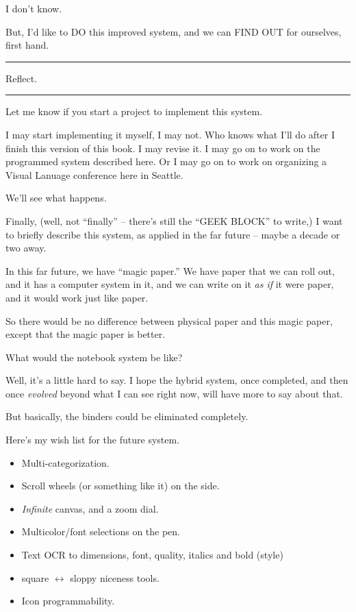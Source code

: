 \documentclass[oneside,fontsize=10,a5paper]{scrbook}
\newcommand\pause{\bigskip\noindent}
\begin{document}
I don't know.

But, I'd like to DO this improved system, and we can FIND OUT for
ourselves, first hand.

\pause
\hrule

Reflect.

\hrule
\pause

Let me know if you start a project to implement this system.

I may start implementing it myself, I may not. Who knows what I'll do
after I finish this version of this book. I may revise it. I may go on
to work on the programmed system described here. Or I may go on to
work on organizing a Visual Lanuage conference here in Seattle.

We'll see what happens.

Finally, (well, not ``finally'' -- there's still the ``GEEK BLOCK'' to
write,) I want to briefly describe this system, as applied in the far
future -- maybe a decade or two away.

In this far future, we have ``magic paper.'' We have paper that we can
roll out, and it has a computer system in it, and we can write on it
\emph{as if} it were paper, and it would work just like paper.

So there would be no difference between physical paper and this magic
paper, except that the magic paper is better.

What would the notebook system be like?

Well, it's a little hard to say. I hope the hybrid system, once
completed, and then once \emph{evolved} beyond what I can see right now,
will have more to say about that.

But basically, the binders could be eliminated completely.

Here's my wish list for the future system.

\begin{itemize}
\item Multi-categorization.
\item Scroll wheels (or something like it) on the side.
\item \emph{Infinite} canvas, and a zoom dial.
\item Multicolor/font selections on the pen.
\item Text OCR to dimensions, font, quality, italics and bold (style)
\item square $\leftrightarrow$ sloppy niceness tools.
\item Icon programmability.
\end{itemize}
\end{document}
